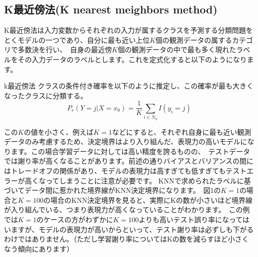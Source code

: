 \documentclass[uplatex]{jsarticle}
\begin{document}
\subsection{K最近傍法(K nearest meighbors method)}
K最近傍法は入力変数からそれぞれの入力が属するクラスを予測する分類問題をとくモデルの一つであり、自分に最も近い上位$K$個の観測データの属するカテゴリで多数決を行い、\
自身の最近傍$K$個の観測データの中で最も多く現れたラベルをその入力データのラベルとします。これを定式化すると以下のようになります。
\begin{itembox}[l]{k最近傍法}
  クラスの条件付き確率を以下のように推定し、この確率が最も大きくなったクラスに分類する。
    $$P_r(Y = j|X = x_0) = \frac{1}{K}\sum_{i \in N_0} I(y_i = j)$$
\end{itembox}
この$K$の値を小さく、例えば$K = 1$などにすると、それぞれ自身に最も近い観測データのみ考慮するため、決定境界はより入り組んだ、表現力の高いモデルになります。この場合学習データに対しては高い精度を誇るものの、\
テストデータでは謝り率が高くなることがあります。前述の通りバイアスとバリアンスの間にはトレードオフの関係があり、モデルの表現力は高すぎても低すぎてもテストエラーが高くなってしまうことに注意が必要です。
KNNで求められたラベルに基づいてデータ間に惹かれた境界線がKNN決定境界になります。\
図1の$K=1$の場合と$K=100$の場合のKNN決定境界を見ると、実際にKの数が小さいほど境界線が入り組んでいる、つまり表現力が高くなっていることがわかります。\
この例では$K=1のケースの方がわずかにK=100$よりも高いテスト誤り率になってはいますが、モデルの表現力が高いからといって、テスト謝り率は必ずしも下がるわけではありません。（ただし学習謝り率についてはKの数を減らすほど小さくなう傾向にあります）\
\end{document}
